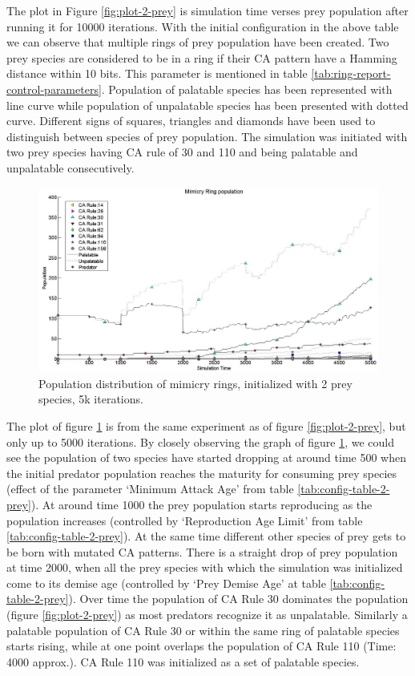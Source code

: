 \documentclass[letterpaper]{article}
\numberwithin{equation}{section}
\begin{document}
The plot in Figure \ref{fig:plot-2-prey} is simulation time verses prey population after running it for 10000 iterations. With the initial configuration in the above table we can observe that multiple rings of prey population have been created. Two prey species are considered to be in a ring if their CA pattern have a Hamming distance within 10 bits. This parameter is mentioned in table \ref{tab:ring-report-control-parameters}. Population of palatable species has been represented with line curve while population of unpalatable species has been presented with dotted curve. Different signs of squares, triangles and diamonds have been used to distinguish between species of prey population. The simulation was initiated with two prey species having CA rule of 30 and 110 and being palatable and unpalatable consecutively.

\begin{figure}[H]
	\centering
	\includegraphics[scale=0.40]{../tex/images/simTime5k-2Prey}
	\caption[Population distribution of mimicry rings (2 prey species, 5k iterations)]{Population distribution of mimicry rings, initialized with 2 prey species, 5k iterations.}
	\label{fig:plot-2-prey-5k}
\end{figure}

The plot of figure \ref{fig:plot-2-prey-5k} is from the same experiment as of figure \ref{fig:plot-2-prey}, but only up to 5000 iterations. By closely observing the graph of figure \ref{fig:plot-2-prey-5k}, we could see the population of two species have started dropping at around time 500 when the initial predator population reaches the maturity for consuming prey species (effect of the parameter `Minimum Attack Age' from table \ref{tab:config-table-2-prey}). At around time 1000 the prey population starts reproducing as the population increases (controlled by `Reproduction Age Limit' from table \ref{tab:config-table-2-prey}). At the same time different other species of prey gets to be born with mutated CA patterns. There is a straight drop of prey population at time 2000, when all the prey species with which the simulation was initialized come to its demise age (controlled by `Prey Demise Age' at table \ref{tab:config-table-2-prey}). Over time the population of CA Rule 30 dominates the population (figure \ref{fig:plot-2-prey}) as most predators recognize it as unpalatable. Similarly a palatable population of CA Rule 30 or within the same ring of palatable species starts rising, while at one point overlaps the population of CA Rule 110 (Time: 4000 approx.). CA Rule 110 was initialized as a set of palatable species.
\end{document}
